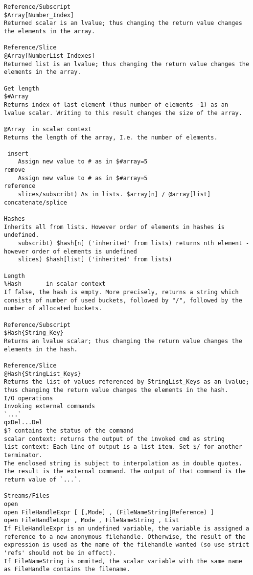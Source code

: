\documentclass{article}
\begin{document}
\begin{description}
{\begin{verbatim}
Reference/Subscript
$Array[Number_Index]		
Returned scalar is an lvalue; thus changing the return value changes the elements in the array.

Reference/Slice
@Array[NumberList_Indexes]	
Returned list is an lvalue; thus changing the return value changes the elements in the array.

Get length
$#Array	
Returns index of last element (thus number of elements -1) as an lvalue scalar. Writing to this result changes the size of the array.

@Array	in scalar context
Returns the length of the array, I.e. the number of elements.

 insert
    Assign new value to # as in $#array=5
remove
    Assign new value to # as in $#array=5
reference 
    slices/subscribt) As in lists. $array[n] / @array[list]
concatenate/splice

Hashes
Inherits all from lists. However order of elements in hashes is undefined.
    subscribt) $hash[n] ('inherited' from lists) returns nth element - however order of elements is undefined
    slices) $hash[list] ('inherited' from lists)

Length
%Hash		in scalar context
If false, the hash is empty. More precisely, returns a string which consists of number of used buckets, followed by "/", followed by the number of allocated buckets. 

Reference/Subscript
$Hash{String_Key}	
Returns an lvalue scalar; thus changing the return value changes the elements in the hash.

Reference/Slice
@Hash{StringList_Keys}	
Returns the list of values referenced by StringList_Keys as an lvalue; thus changing the return value changes the elements in the hash.
I/O operations
Invoking external commands
`...`	
qxDel...Del
$? contains the status of the command
scalar context: returns the output of the invoked cmd as string
list context: Each line of output is a list item. Set $/ for another terminator.
The enclosed string is subject to interpolation as in double quotes. The result is the external command. The output of that command is the return value of `...`. 

Streams/Files
open
open FileHandleExpr [ [,Mode] , (FileNameString|Reference) ]
open FileHandleExpr , Mode , FileNameString , List
If FileHandleExpr is an undefined variable, the variable is assigned a reference to a new anonymous filehandle. Otherwise, the result of the expression is used as the name of the filehandle wanted (so use strict 'refs' should not be in effect).
If FileNameString is ommited, the scalar variable with the same name as FileHandle contains the filename. 


\end{verbatim}}
\end{description}
\end{document}
